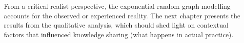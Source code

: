 From a critical realist perspective, the exponential random graph modelling accounts for the observed or experienced reality. The next chapter presents the results from the qualitative analysis, which should shed light on contextual factors that influenced knowledge sharing (what happens in actual practice).